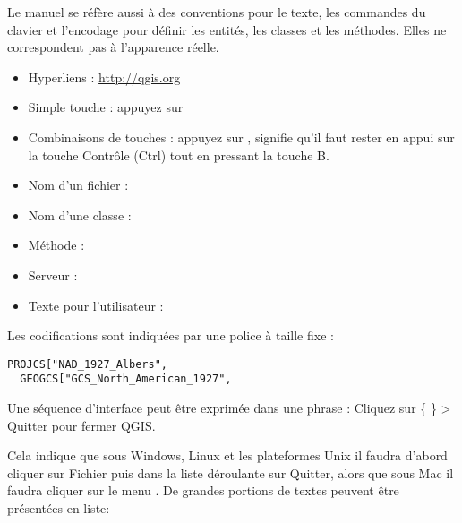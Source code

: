 
Le manuel se réfère aussi à des conventions pour le texte, les commandes du clavier et l'encodage pour définir les entités, les classes et les méthodes. Elles ne correspondent pas à l'apparence réelle.

\begin{itemize}[label=--]
\item Hyperliens : \url{http://qgis.org}
\item Simple touche : appuyez sur 
\item Combinaisons de touches : appuyez sur , signifie qu'il faut rester en appui sur la touche Contrôle (Ctrl) tout en pressant la touche B.
\item Nom d'un fichier : 
\item Nom d'une classe : 
\item Méthode : 
\item Serveur : 
\item Texte pour l'utilisateur : 
\end{itemize}

Les codifications sont indiquées par une police à taille fixe :
\begin{verbatim}
PROJCS["NAD_1927_Albers",
  GEOGCS["GCS_North_American_1927",
\end{verbatim}


Une séquence d'interface peut être exprimée dans une phrase : Cliquez sur \{\nix{} \} > Quitter pour fermer QGIS. 

Cela indique que sous Windows, Linux et les plateformes Unix il faudra d'abord cliquer sur Fichier puis dans la liste déroulante sur Quitter, alors que sous Mac il faudra cliquer sur le menu \qg. De grandes portions de textes peuvent être présentées en liste:

